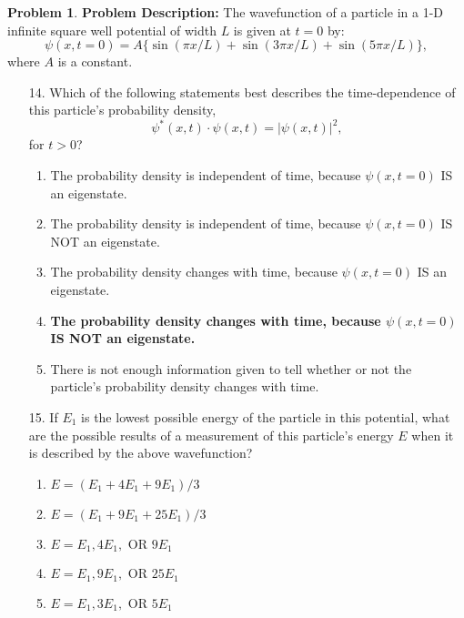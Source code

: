 \documentclass[12pt]{article}
\theoremstyle{definition} %
\newtheorem{problem}{Problem}
\theoremstyle{plain} %
\begin{document}
\begin{problem}
    \textbf{Problem Description:}
The wavefunction of a particle in a 1-D infinite square well potential of width \(L\) is given at \(t=0\) by:
$$
\psi(x, t=0) = A \{ \sin(\pi x / L) + \sin(3\pi x / L) + \sin(5\pi x / L) \},
$$
where \(A\) is a constant.

\begin{enumerate}
    \item[14.] Which of the following statements best describes the time-dependence of this particle's probability density, 
    $$
    \psi^*(x, t) \cdot \psi(x, t) = |\psi(x, t)|^2,
    $$
    for \(t > 0\)?
    \begin{enumerate}
        \item The probability density is independent of time, because \(\psi(x, t=0)\) IS an eigenstate.
        \item The probability density is independent of time, because \(\psi(x, t=0)\) IS NOT an eigenstate.
        \item The probability density changes with time, because \(\psi(x, t=0)\) IS an eigenstate.
        \item \textbf{The probability density changes with time, because \(\psi(x, t=0)\) IS NOT an eigenstate.}
        \item There is not enough information given to tell whether or not the particle's probability density changes with time.
    \end{enumerate}

    \item[15.] If \(E_1\) is the lowest possible energy of the particle in this potential, what are the possible results of a measurement of this particle's energy \(E\) when it is described by the above wavefunction?
    \begin{enumerate}
        \item \(E = (E_1 + 4E_1 + 9E_1) / 3\)
        \item \(E = (E_1 + 9E_1 + 25E_1) / 3\)
        \item \(E = E_1, 4E_1, \text{ OR } 9E_1\)
        \item \textbf{\(E = E_1, 9E_1, \text{ OR } 25E_1\)}
        \item \(E = E_1, 3E_1, \text{ OR } 5E_1\)
    \end{enumerate}
\end{enumerate}


\end{problem}
\end{document}
